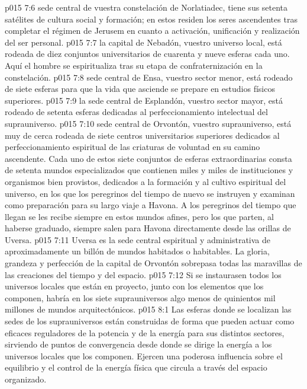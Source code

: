 \vs p015 7:6 \pc {} sede central de vuestra constelación de Norlatiadec, tiene sus setenta satélites de cultura social y formación; en estos residen los seres ascendentes tras completar el régimen de Jerusem en cuanto a activación, unificación y realización del ser personal.
\vs p015 7:7 \pc {} la capital de Nebadón, vuestro universo local, está rodeada de diez conjuntos universitarios de cuarenta y nueve esferas cada uno. Aquí el hombre se espiritualiza tras su etapa de confraternización en la constelación.
\vs p015 7:8 \pc {} sede central de Ensa, vuestro sector menor, está rodeado de siete esferas para que la vida que asciende se prepare en estudios físicos superiores.
\vs p015 7:9 \pc {} la sede central de Esplandón, vuestro sector mayor, está rodeado de setenta esferas dedicadas al perfeccionamiento intelectual del suprauniverso.
\vs p015 7:10 \pc {} sede central de Orvontón, vuestro suprauniverso, está muy de cerca rodeada de siete centros universitarios superiores dedicados al perfeccionamiento espiritual de las criaturas de voluntad en su camino ascendente. Cada uno de estos siete conjuntos de esferas extraordinarias consta de setenta mundos especializados que contienen miles y miles de instituciones y organismos bien provistos, dedicados a la formación y al cultivo espiritual del universo, en los que los peregrinos del tiempo de nuevo se instruyen y examinan como preparación para su largo viaje a Havona. A los peregrinos del tiempo que llegan se les recibe siempre en estos mundos afines, pero los que parten, al haberse graduado, siempre salen para Havona directamente desde las orillas de Uversa.
\vs p015 7:11 Uversa es la sede central espiritual y administrativa de aproximadamente un billón de mundos habitados o habitables. La gloria, grandeza y perfección de la capital de Orvontón sobrepasa todas las maravillas de las creaciones del tiempo y del espacio.
\vs p015 7:12 \pc Si se instaurasen todos los universos locales que están en proyecto, junto con los elementos que los componen, habría en los siete suprauniversos algo menos de quinientos mil millones de mundos arquitectónicos.
\vs p015 8:1 Las esferas donde se localizan las sedes de los suprauniversos están construidas de forma que pueden actuar como eficaces reguladores de la potencia y de la energía para sus distintos sectores, sirviendo de puntos de convergencia desde donde se dirige la energía a los universos locales que los componen. Ejercen una poderosa influencia sobre el equilibrio y el control de la energía física que circula a través del espacio organizado.
